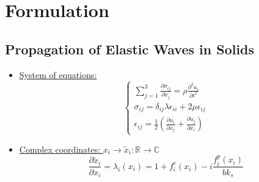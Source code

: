 \section{Formulation}
\subsection{Propagation of Elastic Waves in Solids}
\begin{frame}
\begin{itemize}
\item \underline{System of equations:}
\begin{equation}
\begin{cases}
\sum_{j=1}^3\frac{\partial \sigma_{ij}}{\partial x_j} = \rho \frac{\partial^2 u_i}{\partial t^2} \\
\sigma_{ij} = \delta_{ij}\lambda\epsilon_{ii} + 2\mu\epsilon_{ij} \\
\epsilon_{ij} = \frac{1}{2}\left(\frac{\partial u_i}{\partial x_j} + \frac{\partial u_j}{\partial x_i} \right)
\end{cases}
\end{equation}
\item \underline{Complex coordinates: $x_i \rightarrow \tilde{x}_i: \mathbb{R} \rightarrow \mathbb{C}$}
\begin{equation}
\frac{\partial \tilde{x}_i}{\partial x_i} = \lambda_i(x_i) = 1+f_i^e(x_i)-i \frac{f^p_i(x_i)}{b k_s}
\end{equation}
\end{itemize}
\end{frame}